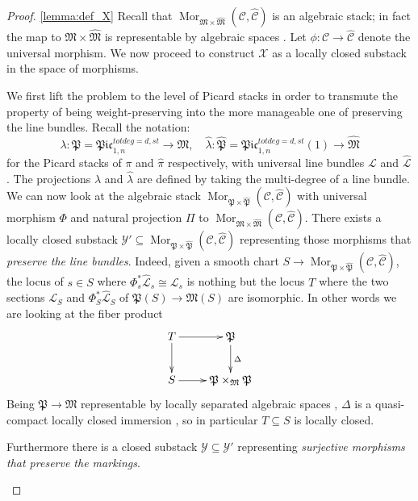\documentclass[11pt]{amsart}
\renewcommand{\to}{\rightarrow}
\renewcommand{\L}{\mathcal L}
\newcommand{\hL}{\widehat{\mathcal L}}
\newcommand{\cC}{\mathcal C}
\newcommand{\hC}{\widehat{\mathcal C}}
\newcommand{\MM}{\mathfrak M}
\newcommand{\hP}{\widehat{\mathfrak P}}
\newcommand{\hM}{\widehat{\mathfrak M}}
\newcommand{\PtoM}{\lambda}
\theoremstyle{plain}
\theoremstyle{definition}
\begin{document}
\begin{proof}\ref{lemma:def_X}
Recall that $\operatorname{Mor}_{\MM\times\hM}(\cC,\hC)$ is an algebraic stack; in fact the map to $\MM\times\hM$ is representable by algebraic spaces \cite{OlssonHOM}. Let $\phi\colon\cC\to\hC$ denote the universal morphism. We now proceed to construct $\mathcal X$ as a locally closed substack in the space of morphisms.

\begin{description}[labelindent=0cm,leftmargin=\parindent]

\item[Step 1] We first lift the problem to the level of Picard stacks in order to transmute the property of being weight-preserving into the more manageable one of preserving the line bundles. Recall the notation:
 \[\PtoM\colon\mathfrak P=\mathfrak{Pic}^{tot deg=d,st}_{1,n}\to\MM,\quad \hat\PtoM\colon\hP=\mathfrak{Pic}^{tot deg=d,st}_{1,n}(1)\to\hM\]
  for the Picard stacks of $\pi$ and $\hat \pi$ respectively, with universal line bundles $\L$ and $\hL$. The projections $\PtoM$ and $\hat \PtoM$ are defined by taking the multi-degree of a line bundle. We can now look at the algebraic stack $\operatorname{Mor}_{\mathfrak{P}\times\hP}(\cC,\hC)$ with universal morphism
 $\Phi$ and natural projection $\Pi$ to $\operatorname{Mor}_{\MM\times\hM}(\cC,\hC)$. There exists a locally closed substack $\mathcal{Y'}\subseteq \operatorname{Mor}_{\mathfrak{P}\times\hP}(\cC,\hC)$ representing those morphisms that \emph{preserve the line bundles}. Indeed, given a smooth chart $S\to\operatorname{Mor}_{\mathfrak{P}\times\hP}(\cC,\hC)$, the locus of $s\in S$ where $\Phi_s^*\hL_s\cong\mathcal{L}_s$ is nothing but the locus $T$ where the two sections $\mathcal{L}_S$ and $\Phi_S^*\hL_S$ of $\mathfrak{P}(S)\to\MM(S)$ are isomorphic. In other words we are looking at the fiber product 
  \[\xymatrix{T\ar[r]\ar[d]&\mathfrak{P}\ar[d]^{\Delta}\\
  S\ar[r]&\mathfrak{P}\times_{\MM}\mathfrak{P}}\]
Being $\mathfrak{P}\to\MM$ representable by locally separated algebraic spaces \cite[Theorem~8.3.1]{neron}, $\Delta$ is a quasi-compact locally closed immersion \cite[\href{http://stacks.math.columbia.edu/tag/04YU}{Tag 04YU}]{stacks-project}, so in particular $T\subseteq S$ is locally closed.

\item[Step 2] 
Furthermore there is a closed substack $\mathcal Y\subseteq \mathcal Y'$ representing \emph{surjective morphisms that preserve the markings}.


\end{description}
\end{proof}
\end{document}
